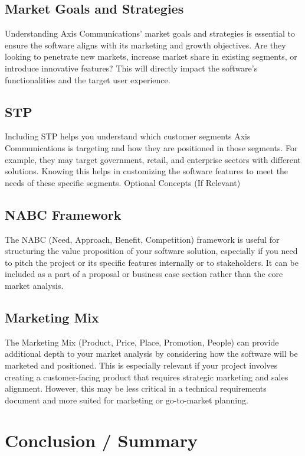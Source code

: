 \documentclass{article}
\begin{document}
\subsection{Market Goals and Strategies}
Understanding Axis Communications' market goals and strategies is essential to ensure the software aligns with its marketing and growth objectives. Are they looking to penetrate new markets, increase market share in existing segments, or introduce innovative features? This will directly impact the software’s functionalities and the target user experience.


\subsection{STP}
Including STP helps you understand which customer segments Axis Communications is targeting and how they are positioned in those segments. For example, they may target government, retail, and enterprise sectors with different solutions. Knowing this helps in customizing the software features to meet the needs of these specific segments.
Optional Concepts (If Relevant)


\subsection{NABC Framework}
The NABC (Need, Approach, Benefit, Competition) framework is useful for structuring the value proposition of your software solution, especially if you need to pitch the project or its specific features internally or to stakeholders. It can be included as a part of a proposal or business case section rather than the core market analysis.


\subsection{Marketing Mix}
The Marketing Mix (Product, Price, Place, Promotion, People) can provide additional depth to your market analysis by considering how the software will be marketed and positioned. This is especially relevant if your project involves creating a customer-facing product that requires strategic marketing and sales alignment. However, this may be less critical in a technical requirements document and more suited for marketing or go-to-market planning.

\newpage
\section{Conclusion / Summary}


\newpage
\printbibliography
\end{document}
